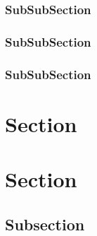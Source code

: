 \subsubsection{SubSubSection}

\subsubsection{SubSubSection}

\subsubsection{SubSubSection}

\section{Section}

\section{Section}

\subsection{Subsection}
